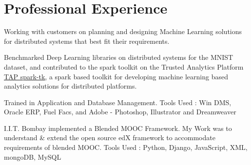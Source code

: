 \documentclass[hidelinks,letterpaper]{deedy-resume-openfont} %
\begin{document}
\begin{minipage}[t]{0.66\textwidth} %




\section{Professional Experience}
{}
\small Working with customers on planning and designing Machine Learning solutions for distributed systems that best fit their requirements.

\small Benchmarked Deep Learning libraries on distributed systems for the MNIST dataset, and contributed to the spark toolkit on the Trusted Analytics Platform \href{https://github.com/trustedanalytics/spark-tk}{\underline{TAP spark-tk}}, a spark based toolkit for developing machine learning based analytics solutions for distributed platforms.


\small Trained in Application and Database Management. Tools Used : Win DMS, Oracle ERP, Fuel Facs, and Adobe - Photoshop, Illustrator and Dreamweaver


\small I.I.T. Bombay implemented a Blended MOOC Framework. My Work was to understand \& extend the open source edX framework to accommodate requirements of blended MOOC. Tools Used : Python, Django, JavaScript, XML, mongoDB, MySQL


\end{minipage}
\end{document}
